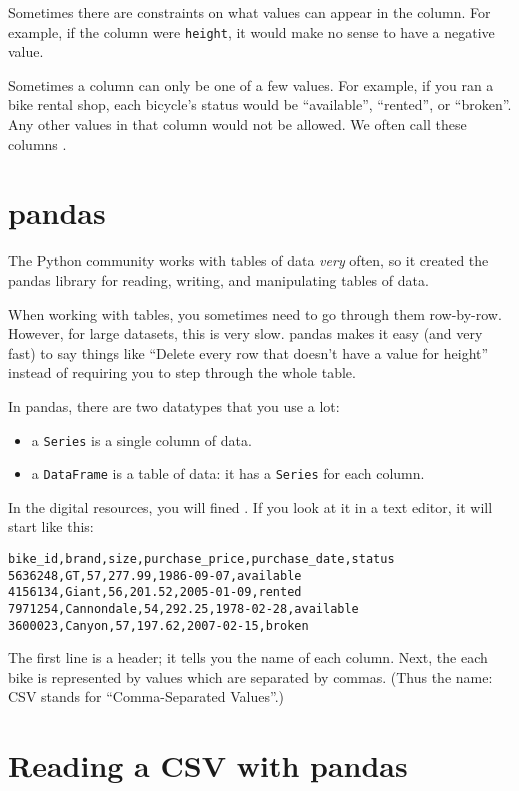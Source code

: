 Sometimes there are constraints on what values can appear in the
column.  For example, if the column were \texttt{height}, it would make no
sense to have a negative value.

Sometimes a column can only be one of a few values. For example, if
you ran a bike rental shop, each bicycle's status would be ``available'',
``rented'', or ``broken''.  Any other values in that column would not
be allowed.  We often call these columns .

\section{pandas}

The Python community works with tables of data \emph{very} often, so it
created the pandas library for reading, writing, and manipulating
tables of data.

When working with tables, you sometimes need to go through them
row-by-row. However, for large datasets, this is very slow. pandas
makes it easy (and very fast) to say things like ``Delete every row
that doesn't have a value for height'' instead of requiring you to
step through the whole table.

In pandas, there are two datatypes that you use a lot:
\begin{itemize}
\item a \texttt{Series} is a single column of data.
\item a \texttt{DataFrame} is a table of data: it has a \texttt{Series} for each column.
\end{itemize}

In the digital resources, you will fined . If you
look at it in a text editor, it will start like this:
\begin{Verbatim}
bike_id,brand,size,purchase_price,purchase_date,status
5636248,GT,57,277.99,1986-09-07,available
4156134,Giant,56,201.52,2005-01-09,rented
7971254,Cannondale,54,292.25,1978-02-28,available
3600023,Canyon,57,197.62,2007-02-15,broken
\end{Verbatim}

The first line is a header; it tells you the name of each column.
Next, the each bike is represented by values which are separated by commas. (Thus the name: CSV stands
for ``Comma-Separated Values''.)

\section{Reading a CSV with pandas}

